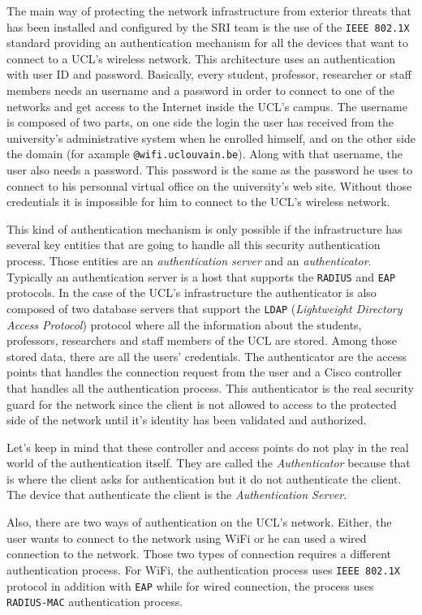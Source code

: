 The main way of protecting the network infrastructure from exterior threats that has been installed and configured by the SRI team is the use of the \texttt{IEEE 802.1X} standard providing an authentication mechanism for all the devices that want to connect to a UCL's wireless network. This architecture uses an authentication with user ID and password. Basically, every student, professor, researcher or staff members needs an username and a password in order to connect to one of the networks and get access to the Internet inside the UCL's campus. The username is composed of two parts, on one side the login the user has received from the university's administrative system when he enrolled himself, and on the other side the domain (for axample \texttt{@wifi.uclouvain.be}). Along with that username, the user also needs a password. This password is the same as the password he uses to connect to his personnal virtual office on the university's web site. Without those credentials it is impossible for him to connect to the UCL's wireless network.

This kind of authentication mechanism is only possible if the infrastructure has several key entities that are going to handle all this security authentication process. Those entities are an \textit{authentication server} and an \textit{authenticator}. Typically an authentication server is a host that supports the \texttt{RADIUS} and  \texttt{EAP} protocols. In the case of the UCL's infrastructure the authenticator is also composed of two database servers that support the \texttt{LDAP} (\textit{Lightweight Directory Access Protocol}) protocol where all the information about the students, professors, researchers and staff members of the UCL are stored. Among those stored data, there are all the users' credentials. The authenticator are the access points that handles the connection request from the user and a Cisco controller that handles all the authentication process. This authenticator is the real security guard for the network since the client is not allowed to access to the protected side of the network until it's identity has been validated and authorized.

Let's keep in mind that these controller and access points do not play in the real world of the authentication itself. They are called the \textit{Authenticator} because that is where the client asks for authentication but it do not authenticate the client. The device that authenticate the client is the \textit{Authentication Server}.

Also, there are two ways of authentication on the UCL's network. Either, the user wants to connect to the network using WiFi or he can used a wired connection to the network. Those two types of connection requires a different authentication process. For WiFi, the authentication process uses \texttt{IEEE 802.1X} protocol in addition with \texttt{EAP} while for wired connection, the process uses \texttt{RADIUS-MAC} authentication process. 


